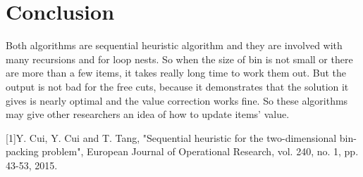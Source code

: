 \documentclass[11pt]{article}
\begin{document}
\section{Conclusion}
    Both algorithms are sequential heuristic algorithm and they are involved with many recursions and for loop nests. So when the size of bin is not small or there are more than a few items, it takes really long time to work them out. But the output is not bad for the free cuts, because it demonstrates that the solution it gives is nearly optimal and the value correction works fine. So these algorithms may give other researchers an idea of how to update items' value.
\begin{thebibliography}{5}
[1]Y.  Cui, Y.  Cui and T.  Tang, "Sequential heuristic for the two-dimensional bin-packing problem", European Journal of Operational Research, vol. 240, no. 1, pp. 43-53, 2015.
\end{thebibliography}
\end{document}
